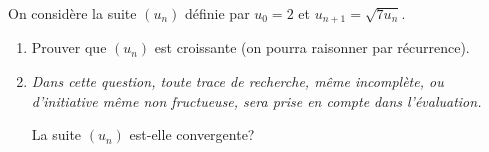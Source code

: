 \documentclass[a4paper,11pt,DIV12,BCOR0mm]{scrartcl}
\begin{document}
\begin{exercice}
 On considère la suite $(u_n)$ définie par $u_0=2$ et $u_{n+1}=\sqrt{7u_n}$.
\begin{enumerate}
 \item Prouver que $(u_n)$ est croissante (on pourra raisonner par récurrence).
 \item \emph{Dans cette question, toute trace de recherche, même incomplète, ou d'initiative
     même non fructueuse, sera prise en compte dans l'évaluation.}


La suite $(u_n)$ est-elle convergente?
\end{enumerate}

\end{exercice}
\end{document}
